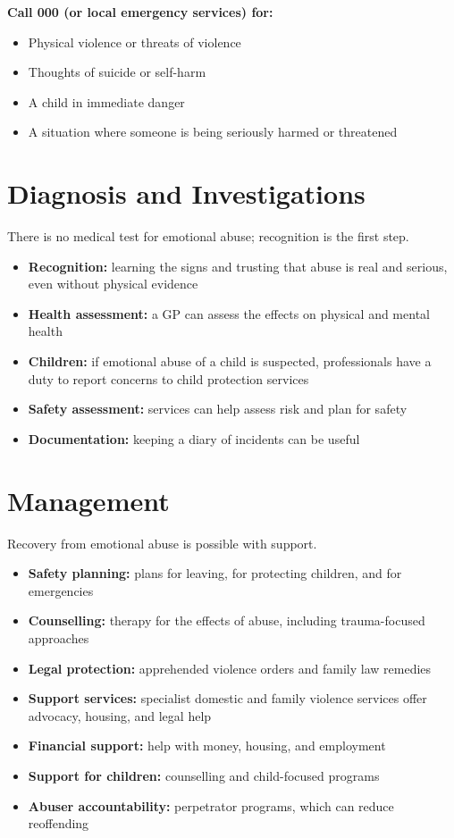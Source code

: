 \textbf{Call 000 (or local emergency services) for:}
\begin{itemize}
    \item Physical violence or threats of violence
    \item Thoughts of suicide or self-harm
    \item A child in immediate danger
    \item A situation where someone is being seriously harmed or threatened
\end{itemize}

\section*{Diagnosis and Investigations}
There is no medical test for emotional abuse; recognition is the first step.
\begin{itemize}
    \item \textbf{Recognition:} learning the signs and trusting that abuse is real and serious, even without physical evidence
    \item \textbf{Health assessment:} a GP can assess the effects on physical and mental health
    \item \textbf{Children:} if emotional abuse of a child is suspected, professionals have a duty to report concerns to child protection services
    \item \textbf{Safety assessment:} services can help assess risk and plan for safety
    \item \textbf{Documentation:} keeping a diary of incidents can be useful
\end{itemize}

\section*{Management}
Recovery from emotional abuse is possible with support.
\begin{itemize}
    \item \textbf{Safety planning:} plans for leaving, for protecting children, and for emergencies
    \item \textbf{Counselling:} therapy for the effects of abuse, including trauma-focused approaches
    \item \textbf{Legal protection:} apprehended violence orders and family law remedies
    \item \textbf{Support services:} specialist domestic and family violence services offer advocacy, housing, and legal help
    \item \textbf{Financial support:} help with money, housing, and employment
    \item \textbf{Support for children:} counselling and child-focused programs
    \item \textbf{Abuser accountability:} perpetrator programs, which can reduce reoffending
\end{itemize}

